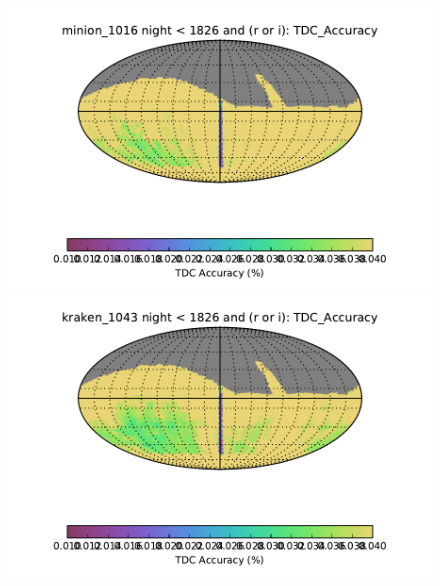 \begin{figure}[!ht]
  \capstart
  \begin{minipage}[b]{\linewidth}
    \begin{minipage}[b]{0.48\linewidth}
       \centering\includegraphics[width=\linewidth]{figs/lenstimedelays/minion_1016_TDC_Accuracy_night_lt_1826_and_r_or_i_HEAL_SkyMap.pdf}
    \end{minipage} \hfill
    \begin{minipage}[b]{0.48\linewidth}
       \centering\includegraphics[width=\linewidth]{figs/lenstimedelays/kraken_1043_TDC_Accuracy_night_lt_1826_and_r_or_i_HEAL_SkyMap.pdf}
    \end{minipage}
  \end{minipage}
  \begin{minipage}[b]{\linewidth}
    \begin{minipage}[b]{0.48\linewidth}

\end{minipage}
\end{minipage}
\end{figure}
